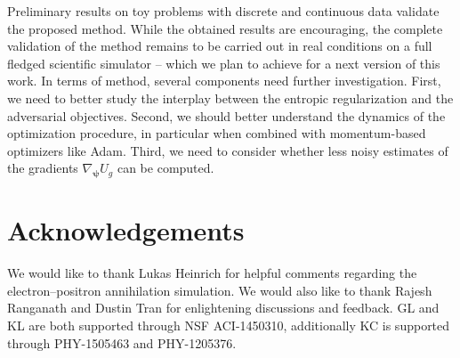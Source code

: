 \documentclass{article}
\newcommand{\glnote}[1]{\textcolor{red}{[GL: #1]}}
\newcommand{\bfpsi}{{\bm \psi}}
\theoremstyle{plain}
\begin{document}
Preliminary results on toy problems with discrete and continuous data validate
the proposed method. While the obtained results are encouraging, the complete
validation of the method remains to be carried out in real conditions on a full
fledged scientific simulator -- which we plan to achieve for a next version of
this work. In terms of method, several components need further investigation.
First, we need to better study the interplay between the entropic regularization and the
adversarial objectives. Second, we should better understand the dynamics of the
optimization procedure, in particular when combined with momentum-based
optimizers like Adam. Third, we need to consider whether less noisy estimates of
the gradients $\nabla_\bfpsi U_g$ can be computed.



\section*{Acknowledgements}

We would like to thank Lukas Heinrich for helpful comments regarding
the electron--positron annihilation simulation. We would also like to thank
Rajesh Ranganath and Dustin Tran for enlightening discussions and feedback.
GL and KL are both supported through NSF ACI-1450310, additionally KC is
supported through PHY-1505463 and PHY-1205376.





%
\end{document}
